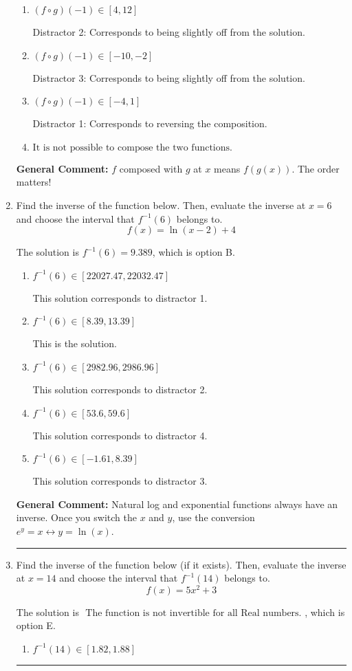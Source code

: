 \documentclass{extbook}[14pt]
\newcommand{\litem}[1]{\item #1

\rule{\textwidth}{0.4pt}}
\begin{document}
\begin{enumerate}
{\begin{enumerate}[label=\Alph*.]
* This is the correct solution
\item \( (f \circ g)(-1) \in [4, 12] \)

 Distractor 2: Corresponds to being slightly off from the solution.
\item \( (f \circ g)(-1) \in [-10, -2] \)

 Distractor 3: Corresponds to being slightly off from the solution.
\item \( (f \circ g)(-1) \in [-4, 1] \)

 Distractor 1: Corresponds to reversing the composition.
\item \( \text{It is not possible to compose the two functions.} \)


\end{enumerate}

\textbf{General Comment:} $f$ composed with $g$ at $x$ means $f(g(x))$. The order matters!
}
\litem{
Find the inverse of the function below. Then, evaluate the inverse at $x = 6$ and choose the interval that $f^{-1}(6)$ belongs to.
\[ f(x) = \ln{(x-2)}+4 \]

The solution is \( f^{-1}(6) = 9.389 \), which is option B.\begin{enumerate}[label=\Alph*.]
\item \( f^{-1}(6) \in [22027.47, 22032.47] \)

 This solution corresponds to distractor 1.
\item \( f^{-1}(6) \in [8.39, 13.39] \)

 This is the solution.
\item \( f^{-1}(6) \in [2982.96, 2986.96] \)

 This solution corresponds to distractor 2.
\item \( f^{-1}(6) \in [53.6, 59.6] \)

 This solution corresponds to distractor 4.
\item \( f^{-1}(6) \in [-1.61, 8.39] \)

 This solution corresponds to distractor 3.
\end{enumerate}

\textbf{General Comment:} Natural log and exponential functions always have an inverse. Once you switch the $x$ and $y$, use the conversion $ e^y = x \leftrightarrow y=\ln(x)$.
}
\litem{
Find the inverse of the function below (if it exists). Then, evaluate the inverse at $x = 14$ and choose the interval that $f^{-1}(14)$ belongs to.
\[ f(x) = 5 x^2 + 3 \]

The solution is \( \text{ The function is not invertible for all Real numbers. } \), which is option E.\begin{enumerate}[label=\Alph*.]
\item \( f^{-1}(14) \in [1.82, 1.88] \)


\end{enumerate}}
\end{enumerate}
\end{document}
